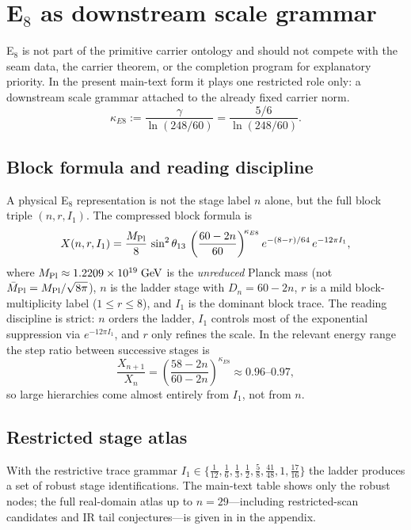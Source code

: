\section{\texorpdfstring{E$_8$}{E8} as downstream scale grammar}

E$_8$ is not part of the primitive carrier ontology and should not compete with the seam data, the carrier theorem, or the completion program for explanatory priority. In the present main-text form it plays one restricted role only: a downstream scale grammar attached to the already fixed carrier norm.
\[
\kappa_{E8}:=\frac{\gamma}{\ln(248/60)}=\frac{5/6}{\ln(248/60)}.
\]

\subsection{Block formula and reading discipline}

A physical E$_8$ representation is not the stage label $n$ alone, but the full block triple $(n,r,I_1)$. The compressed block formula is
\begin{equation}
\label{eq:e8-block-formula}
X(n,r,I_1)
=
\frac{M_{\mathrm{Pl}}}{8}\,\sin^2\theta_{13}\,
\left(\frac{60-2n}{60}\right)^{\!\kappa_{E8}}
e^{-(8-r)/64}\,
e^{-12\pi I_1},
\end{equation}
where $M_{\mathrm{Pl}}\approx\num{1.2209e19}\;\mathrm{GeV}$ is the \emph{unreduced} Planck mass (not $\bar M_{\mathrm{Pl}}=M_{\mathrm{Pl}}/\sqrt{8\pi}$), $n$ is the ladder stage with $D_n=60-2n$, $r$ is a mild block-multiplicity label ($1\le r\le 8$), and $I_1$ is the dominant block trace. The reading discipline is strict: $n$ orders the ladder, $I_1$ controls most of the exponential suppression via $e^{-12\pi I_1}$, and $r$ only refines the scale. In the relevant energy range the step ratio between successive stages is
\[
\frac{X_{n+1}}{X_n}=\left(\frac{58-2n}{60-2n}\right)^{\!\kappa_{E8}}\approx 0.96\text{--}0.97,
\]
so large hierarchies come almost entirely from $I_1$, not from $n$.

\subsection{Restricted stage atlas}

With the restrictive trace grammar $I_1\in\{\frac{1}{12},\frac{1}{6},\frac{1}{3},\frac{1}{2},\frac{5}{8},\frac{41}{48},1,\frac{17}{16}\}$ the ladder produces a set of robust stage identifications. The main-text table shows only the robust nodes; the full real-domain atlas up to $n=29$---including restricted-scan candidates and IR tail conjectures---is given in  in the appendix.


